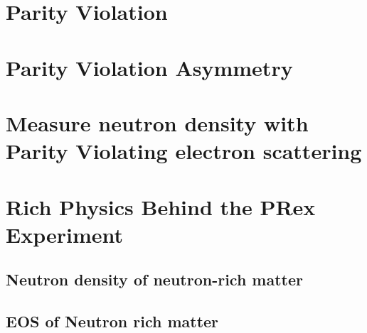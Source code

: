 \section{Parity Violation}
\section{Parity Violation Asymmetry}
\section{Measure neutron density with Parity Violating electron scattering}
\section{Rich Physics Behind the PRex Experiment}
\subsection{Neutron density of neutron-rich matter}
\subsection{EOS of Neutron rich matter}





